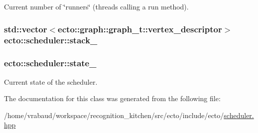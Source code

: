 Current number of \char`\"{}runners\char`\"{} (threads calling a run method). 

\hypertarget{classecto_1_1scheduler_ad2b6561ebc08afd8cf8edaa39cb702b8}{
\subsubsection[{stack\-\_\-}]{\setlength{\rightskip}{0pt plus 5cm}std\-::vector$<$ecto\-::graph\-::graph\-\_\-t\-::vertex\-\_\-descriptor$>$ ecto\-::scheduler\-::stack\-\_\-\hspace{0.3cm}{\ttfamily [private]}}}\label{classecto_1_1scheduler_ad2b6561ebc08afd8cf8edaa39cb702b8}
\hypertarget{classecto_1_1scheduler_a21d2aac4a8a2ef665942b7c9b741250c}{
\subsubsection[{state\-\_\-}]{ ecto\-::scheduler\-::state\-\_\-\hspace{0.3cm}{\ttfamily [private]}}}\label{classecto_1_1scheduler_a21d2aac4a8a2ef665942b7c9b741250c}


Current state of the scheduler. 



The documentation for this class was generated from the following file\-:\begin{DoxyCompactItemize}
\item 
/home/vrabaud/workspace/recognition\-\_\-kitchen/src/ecto/include/ecto/\hyperlink{scheduler_8hpp}{scheduler.\-hpp}\end{DoxyCompactItemize}
